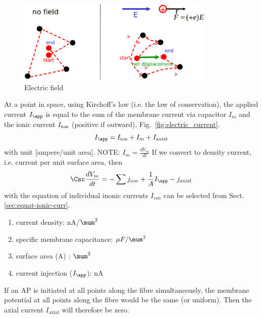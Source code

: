 \begin{figure}[hbt]
  \centerline{\includegraphics[height=4cm,
    angle=0]{./images/electric_field.eps}}
  \caption{Electric field}
  \label{fig:elec_field}
\end{figure}


At a point in space, using Kirchoff's law (i.e. the law of conservation), the
applied current $I_\app$ is equal to the sum of the membrane current via
capacitor $I_m$ and the ionic current $I_{\text{ion}}$ (positive if outward),
Fig.~\ref{fig:electric_current}.
\begin{equation}
  \label{eq:689}
  I_\app = I_\ion + I_m + I_{\text{axial}}
\end{equation}
with unit [ampere/unit area]. NOTE: $I_m = \frac{dV_m}{dt}$ 
If we convert to density current, i.e. current per unit surface area, then
\begin{equation}
\Csc \frac{dV_m}{dt} = - \sum j_{ion} + \frac{1}{A} I_\app - j_{\text{axial}}
\end{equation}
with the equation of individual inonic currents $I_{ion}$ can be selected from
Sect.\ref{sec:equat-ionic-curr}.

\begin{enumerate}
  \item current density: nA/$\mum^2$
  \item specific membrane capacitance: $\mu F/\mum^2$
  \item surface area (A) : $\mum^2$
  \item current injection ($I_\app$): nA
\end{enumerate}

If an AP is initiated at all points along the fibre simultaneously, the membrane
potential at all points along the fibre would be the same (or uniform). Then the
axial current $I_{\text{axial}}$ will therefore be zero. 

